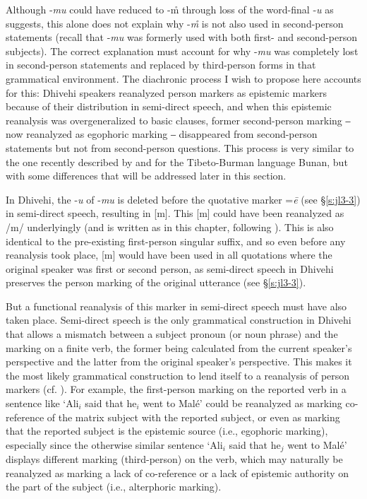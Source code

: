 \documentclass[output=paper]{langsci/langscibook}
\begin{document}
Although ‑\textit{mu} could have reduced to -m̊ through loss of the word-final ‑\textit{u} as \cite[169]{Fritz2002} suggests, this alone does not explain why -\textit{m̊} is not also used in second-person statements (recall that -\textit{mu} was formerly used with both first- and second-person subjects). The correct explanation must account for why -\textit{mu} was completely lost in second-person statements and replaced by third-person forms in that grammatical environment. The diachronic process I wish to propose here accounts for this: Dhivehi speakers reanalyzed person markers as epistemic markers because of their distribution in semi-direct speech, and when this epistemic reanalysis was overgeneralized to basic clauses, former second-person marking ‒ now reanalyzed as egophoric marking ‒ disappeared from second-person statements but not from second-person questions. This process is very similar to the one recently described by \cite{Widmer2015} and \cite{WidmerZemp2017} for the Tibeto-Burman language Bunan, but with some differences that will be addressed later in this section. 

In Dhivehi, the -\textit{u} of -\textit{mu} is deleted before the quotative marker =\textit{ē} (see §\ref{s:jl‎3-3}) in semi-direct speech, resulting in [m]. This [m] could have been reanalyzed as /m/ underlyingly (and is written as in this chapter, following \citealt{Gnanadesikan2017}). This is also identical to the pre-existing first-person singular suffix, and so even before any reanalysis took place, [m] would have been used in all quotations where the original speaker was first or second person, as semi-direct speech in Dhivehi preserves the person marking of the original utterance (see §\ref{s:jl‎3-3}). 

But a functional reanalysis of this marker in semi-direct speech must have also taken place. Semi-direct speech is the only grammatical construction in Dhivehi that allows a mismatch between a subject pronoun (or noun phrase) and the marking on a finite verb, the former being calculated from the current speaker’s perspective and the latter from the original speaker’s perspective. This makes it the most likely grammatical construction to lend itself to a reanalysis of person markers (cf. \citealt[54–56]{WidmerZemp2017}). For example, the first-person marking on the reported verb in a sentence like ‘Ali$_i$ said that he$_i$ went to Malé’ could be reanalyzed as marking co-reference of the matrix subject with the reported subject, or even as marking that the reported subject is the epistemic source (i.e., egophoric marking), especially since the otherwise similar sentence ‘Ali$_i$ said that he$_j$ went to Malé’ displays different marking (third-person) on the verb, which may naturally be reanalyzed as marking a lack of co-reference or a lack of epistemic authority on the part of the subject (i.e., alterphoric marking). 
\end{document}
